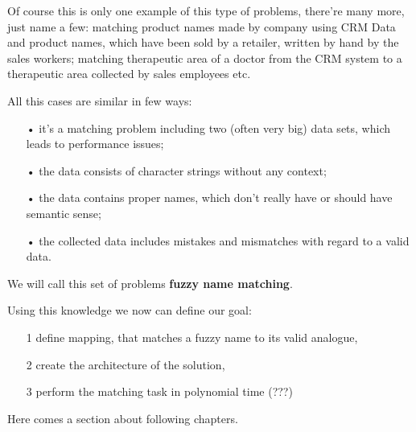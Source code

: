 \documentclass[
	ngerman,
	ruledheaders=section,%
	class=report,%
	thesis={type=bachelor},%
	accentcolor=9c,%
	custommargins=true,%
	marginpar=false,%
	parskip=half-,%
	fontsize=11pt,%
	logofile=tud_logo.png, %
]{tudapub}
\begin{document}
Of course this is only one example of this type of problems, there're many more, just name a few: matching product names made by company using CRM Data and product names, which have been sold by a retailer, written by hand by the sales workers; matching therapeutic area of a doctor from the CRM system to a therapeutic area collected by sales employees etc.

All this cases are similar in few ways: 
\begin{enumerate}
\item[•] it's a matching problem including two (often very big) data sets, which leads to performance issues;
\item[•] the data consists of character strings without any context;
\item[•] the data contains proper names, which don't really have or should have semantic sense;
\item[•] the collected data includes mistakes and mismatches with regard to a valid data.
\end{enumerate}

We will call this set of problems \textbf{fuzzy name matching}.

Using this knowledge we now can define our goal:
\begin{enumerate}
\item[1] define mapping, that matches a fuzzy name to its valid analogue,
\item[2] create the architecture of the solution,
\item[3] perform the matching task in polynomial time (???)
\end{enumerate}

Here comes a section about following chapters.

\end{document}
